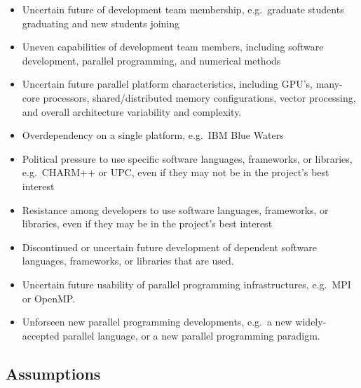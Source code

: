 \documentclass[11pt]{article}
\begin{document}
    \begin{itemize} 
%
    \item Uncertain future of development team membership,
    e.g.~graduate students graduating and new students joining
%
    \item Uneven capabilities of development team members, including
    software development, parallel programming, and numerical methods
%
    \item Uncertain future parallel platform characteristics,
    including GPU's, many-core processors, shared/distributed memory
    configurations, vector processing, and overall architecture
    variability and complexity.
%
    \item Overdependency on a single platform, e.g.~IBM Blue Waters
%
    \item Political pressure to use specific software languages, frameworks, or
    libraries, e.g.~CHARM++ or UPC, even if they may not be in the
    project's best interest
%
    \item Resistance among developers to use software languages, frameworks,
    or libraries, even if they may be in the project's best interest
%
    \item Discontinued or uncertain future development of dependent software
    languages, frameworks, or libraries that are used.
%
    \item Uncertain future usability of parallel programming
    infrastructures, e.g.~MPI or OpenMP.
%
    \item Unforseen new parallel programming developments, e.g.~a new
    widely-accepted parallel language, or a new parallel programming
    paradigm.
\end{itemize}


\subsection{Assumptions}

\end{document}

